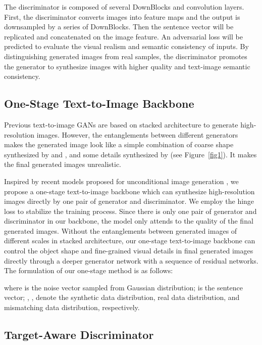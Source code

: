 \documentclass[10pt,twocolumn,letterpaper]{article}
\begin{document}
The discriminator is composed of several DownBlocks and convolution layers. 
First, the discriminator converts images into feature maps and the output is downsampled by a series of DownBlocks. 
Then the sentence vector will be replicated and concatenated on the image feature. 
An adversarial loss will be predicted to evaluate the visual realism and semantic consistency of inputs. 
By distinguishing generated images from real samples, the discriminator promotes the generator to synthesize images with higher quality and text-image semantic consistency.


\subsection{One-Stage Text-to-Image Backbone}
Previous text-to-image GANs are based on stacked architecture \cite{zhang2017stackgan,zhang2018stackgan} to generate high-resolution images. 
However, the entanglements between different generators makes the generated image look like a simple combination of coarse shape synthesized by  and , and some details synthesized by  (see Figure~\ref{fig1}). It makes the final generated images unrealistic.

Inspired by recent models proposed for unconditional image generation \cite{lim2017geometric,zhang2019self}, we propose a one-stage text-to-image backbone which can synthesize high-resolution images directly by one pair of generator and discriminator. 
We employ the hinge loss \cite{lim2017geometric} to stabilize the training process. 
Since there is only one pair of generator and discriminator in our backbone, the model only attends to the quality of the final generated images. 
Without the entanglements between generated images of different scales in stacked architecture, our one-stage text-to-image backbone can control the object shape and fine-grained visual details in final generated images directly through a deeper generator network with a sequence of residual networks.
The formulation of our one-stage method is as follows:


where  is the noise vector sampled from Gaussian distribution;  is the sentence vector; , ,  denote the synthetic data distribution, real data distribution, and mismatching data distribution, respectively.



\subsection{Target-Aware Discriminator}
\end{document}
